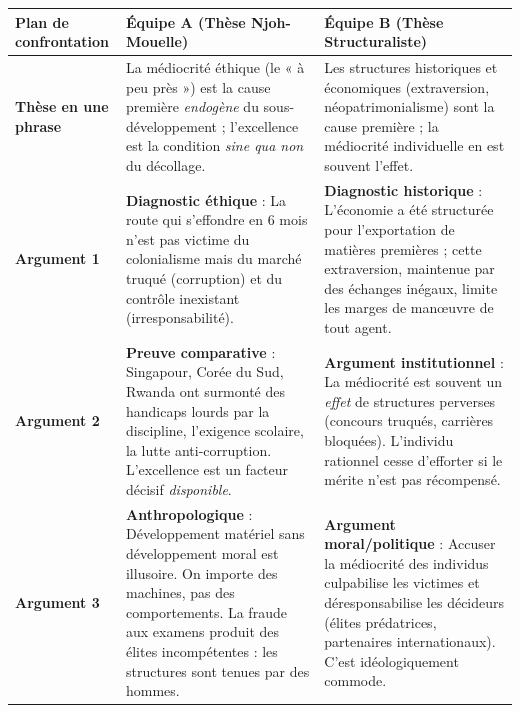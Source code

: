 \documentclass[11pt]{article}
\newcounter{popsec}
\newcounter{popsub}
\newcommand{\courssub}[1]{%
  \stepcounter{popsub}%
  \par\vspace{9pt}\noindent{\popxbold\fontsize{11.5}{13}\selectfont\color{popink}{\color{poporange}\thepopsec.\thepopsub}\hspace{6pt}#1}\par\nopagebreak\vspace{4pt}
}
\begin{document}
\begin{center}
\begin{tabularx}{\linewidth}{|>{\bfseries}l|X|X|}
\hline
\rowcolor{popblueL}
\textbf{Plan de confrontation} & \textbf{Équipe A (Thèse Njoh-Mouelle)} & \textbf{Équipe B (Thèse Structuraliste)} \\ \hline
\textbf{Thèse en une phrase} & La médiocrité éthique (le « à peu près ») est la cause première \emph{endogène} du sous-développement ; l'excellence est la condition \emph{sine qua non} du décollage. & Les structures historiques et économiques (extraversion, néopatrimonialisme) sont la cause première ; la médiocrité individuelle en est souvent l'effet. \\ \hline
\textbf{Argument 1} & \textbf{Diagnostic éthique} : La route qui s'effondre en 6 mois n'est pas victime du colonialisme mais du marché truqué (corruption) et du contrôle inexistant (irresponsabilité). & \textbf{Diagnostic historique} : L'économie a été structurée pour l'exportation de matières premières ; cette extraversion, maintenue par des échanges inégaux, limite les marges de manœuvre de tout agent. \\ \hline
\textbf{Argument 2} & \textbf{Preuve comparative} : Singapour, Corée du Sud, Rwanda ont surmonté des handicaps lourds par la discipline, l'exigence scolaire, la lutte anti-corruption. L'excellence est un facteur décisif \emph{disponible}. & \textbf{Argument institutionnel} : La médiocrité est souvent un \emph{effet} de structures perverses (concours truqués, carrières bloquées). L'individu rationnel cesse d'efforter si le mérite n'est pas récompensé. \\ \hline
\textbf{Argument 3} & \textbf{Anthropologique} : Développement matériel sans développement moral est illusoire. On importe des machines, pas des comportements. La fraude aux examens produit des élites incompétentes : les structures sont tenues par des hommes. & \textbf{Argument moral/politique} : Accuser la médiocrité des individus culpabilise les victimes et déresponsabilise les décideurs (élites prédatrices, partenaires internationaux). C'est idéologiquement commode. \\ \hline
\end{tabularx}
\end{center}

\courssub{Démarche et corrigé commenté}
\end{document}
